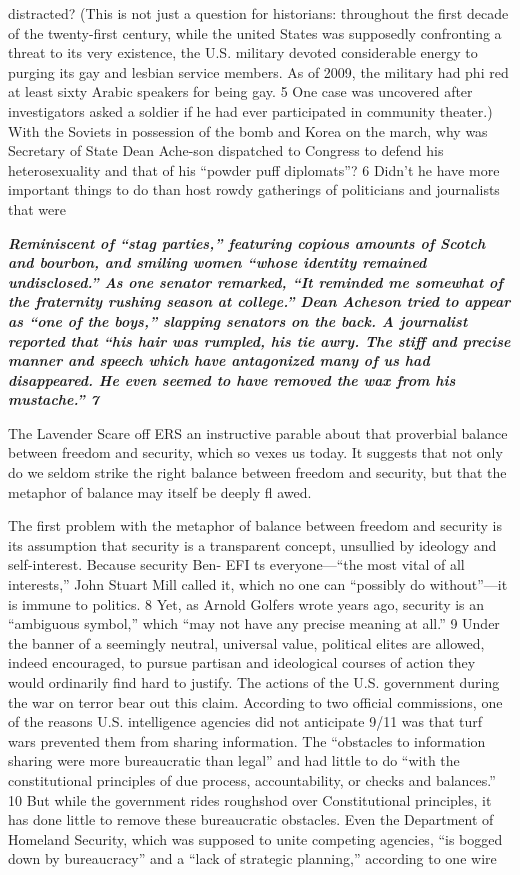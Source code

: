 distracted? (This is not just a question for historians: throughout the first decade of the twenty-first century, while the united States was supposedly confronting a threat to its very existence, the U.S. military devoted considerable energy to purging its gay and lesbian service members. As of 2009, the military had phi red at least sixty Arabic speakers for being gay. {\color{blue} 5 } One case was uncovered after investigators asked a soldier if he had ever participated in community theater.) With the Soviets in possession of the bomb and Korea on the march, why was Secretary of State Dean Ache-son dispatched to Congress to defend his heterosexuality and that of his “powder puff diplomats”? {\color{blue} 6 } Didn’t he have more important things to do than host rowdy gatherings of politicians and journalists that were{\par} {\textbf{\textit{Reminiscent of “stag parties,” featuring copious amounts of Scotch and bourbon, and smiling women “whose identity remained undisclosed.” As one senator remarked, “It reminded me somewhat of the fraternity rushing season at college.” Dean Acheson tried to appear as “one of the boys,” slapping senators on the back. A journalist reported that “his hair was rumpled, his tie awry. The stiff and precise manner and speech which have antagonized many of us had disappeared. He even seemed to have removed the wax from his mustache.” {\color{blue} 7 } } } }{\par} The Lavender Scare off ERS an instructive parable about that proverbial balance between freedom and security, which so vexes us today. It suggests that not only do we seldom strike the right balance between freedom and security, but that the metaphor of balance may itself be deeply fl awed.{\par} The first problem with the metaphor of balance between freedom and security is its assumption that security is a transparent concept, unsullied by ideology and self-interest. Because security Ben- EFI ts everyone—“the most vital of all interests,” John Stuart Mill called it, which no one can “possibly do without”—it is immune to politics. {\color{blue} 8 } Yet, as Arnold Golfers wrote years ago, security is an “ambiguous symbol,” which “may not have any precise meaning at all.” {\color{blue} 9 } Under the banner of a seemingly neutral, universal value, political elites are allowed, indeed encouraged, to pursue partisan and ideological courses of action they would ordinarily find hard to justify. The actions of the U.S. government during the war on terror bear out this claim. According to two official commissions, one of the reasons U.S. intelligence agencies did not anticipate 9/11 was that turf wars prevented them from sharing information. The “obstacles to information sharing were more bureaucratic than legal” and had little to do “with the constitutional principles of due process, accountability, or checks and balances.” {\color{blue} 10 } But while the government rides roughshod over Constitutional principles, it has done little to remove these bureaucratic obstacles. Even the Department of Homeland Security, which was supposed to unite competing agencies, “is bogged down by bureaucracy” and a “lack of strategic planning,” according to one wire 